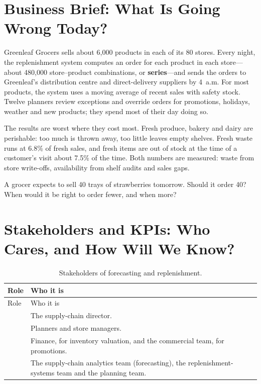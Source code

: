 \section{Business Brief: What Is Going Wrong Today?}
\label{sec:fc-brief}

Greenleaf Grocers sells about 6{,}000 products in each of its 80 stores. Every night, the replenishment system computes an order for each product in each store---about 480{,}000 store--product combinations, or \textbf{series}---and sends the orders to Greenleaf's distribution centre and direct-delivery suppliers by 4~a.m. For most products, the system uses a moving average of recent sales with safety stock. Twelve planners review exceptions and override orders for promotions, holidays, weather and new products; they spend most of their day doing so.

The results are worst where they cost most. Fresh produce, bakery and dairy are perishable: too much is thrown away, too little leaves empty shelves. Fresh waste runs at 6.8\% of fresh sales, and fresh items are out of stock at the time of a customer's visit about 7.5\% of the time. Both numbers are measured: waste from store write-offs, availability from shelf audits and sales gaps.

\begin{thinkabout}
A grocer expects to sell 40 trays of strawberries tomorrow. Should it order 40? When would it be right to order fewer, and when more?
\end{thinkabout}

\section{Stakeholders and KPIs: Who Cares, and How Will We Know?}
\label{sec:fc-kpis}

\begingroup
\small
\begin{xltabular}{\textwidth}{@{}>{\raggedright\arraybackslash}p{2.0cm}>{\raggedright\arraybackslash}X@{}}
\caption{Stakeholders of forecasting and replenishment.}\label{tab:fc-stakeholders}\\
\toprule
{} Role & Who it is \\
\midrule
\endfirsthead
\toprule
{} Role & Who it is \\
\midrule
\endhead
{} & The supply-chain director. \\
 & Planners and store managers. \\
 & Finance, for inventory valuation, and the commercial team, for promotions. \\
 & The supply-chain analytics team (forecasting), the replenishment-systems team and the planning team. \\
\bottomrule
\end{xltabular}
\endgroup

